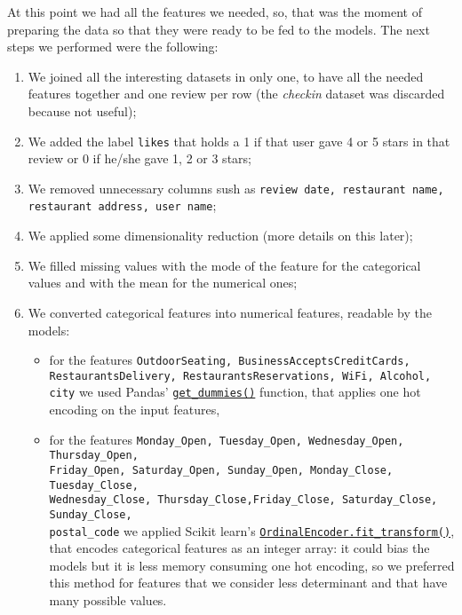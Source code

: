 At this point we had all the features we needed, so, that was the moment of preparing the data so that they were ready to be fed to the models. The next steps we performed were the following:
\begin{enumerate}
	\item We joined all the interesting datasets in only one, to have all the needed features together and one review per row (the \textit{checkin} dataset was discarded because not useful);
	\item We added the label \texttt{likes} that holds a 1 if that user gave 4 or 5 stars in that review or 0 if he/she gave 1, 2 or 3 stars;
	\item We removed unnecessary columns sush as \texttt{review date, restaurant name, restaurant address, user name};
	\item We applied some dimensionality reduction (more details on this later);
	\item We filled missing values with the mode of the feature for the categorical values and with the mean for the numerical ones;
	\item We converted categorical features into numerical features, readable by the models:
	\begin{itemize}
		\item for the features \texttt{OutdoorSeating, BusinessAcceptsCreditCards, RestaurantsDelivery, RestaurantsReservations, WiFi, Alcohol, city} we used Pandas' \href{https://pandas.pydata.org/pandas-docs/stable/reference/api/pandas.get_dummies.html}{\texttt{get\_dummies()}} function, that applies one hot encoding on the input features,
		\item for the features \texttt{Monday\_Open, Tuesday\_Open, Wednesday\_Open, Thursday\_Open,\\ Friday\_Open, Saturday\_Open, Sunday\_Open, Monday\_Close, Tuesday\_Close,\\ Wednesday\_Close, Thursday\_Close,Friday\_Close, Saturday\_Close, Sunday\_Close,\\ postal\_code} we applied Scikit learn's \href{https://scikit-learn.org/stable/modules/generated/sklearn.preprocessing.OrdinalEncoder.html}{\texttt{OrdinalEncoder.fit\_transform()}}, that encodes categorical features as an integer array: it could bias the models but it is less memory consuming \wrt one hot encoding, so we preferred this method for features that we consider less determinant and that have many possible values.
	\end{itemize}
\end{enumerate}

